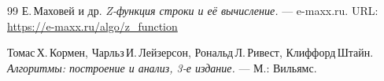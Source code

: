 \begin{thebibliography}{99}
Е.\,Маховей и др.
{\itshape Z-функция строки и её вычисление.}
--- e-maxx.ru. URL: \url{https://e-maxx.ru/algo/z_function}

Томас\,Х.\,Кормен, Чарльз\,И.\,Лейзерсон, Рональд\,Л.\,Ривест, Клиффорд\,Штайн.
{\itshape Алгоритмы: построение и анализ, 3-е издание.} --- М.: Вильямс.

\end{thebibliography}
\pagebreak

